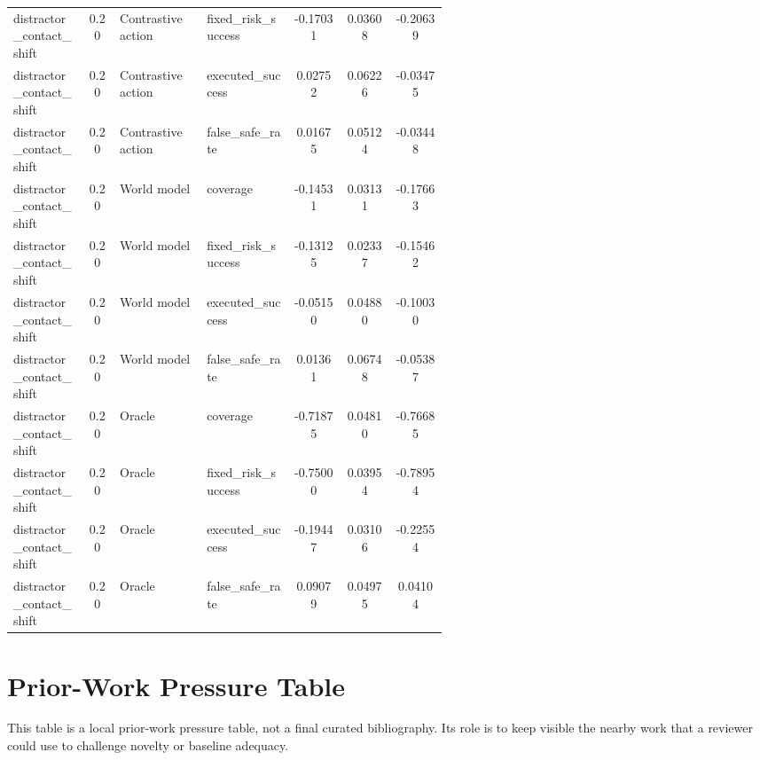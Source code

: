 \documentclass{article}
\begin{document}
\begin{center}
\begin{longtable}{p{0.17\linewidth}cp{0.20\linewidth}p{0.20\linewidth}ccc}
distractor\_contact\_shift & 0.20 & Contrastive action & fixed\_risk\_success & -0.17031 & 0.03608 & -0.20639\\
distractor\_contact\_shift & 0.20 & Contrastive action & executed\_success & 0.02752 & 0.06226 & -0.03475\\
distractor\_contact\_shift & 0.20 & Contrastive action & false\_safe\_rate & 0.01675 & 0.05124 & -0.03448\\
distractor\_contact\_shift & 0.20 & World model & coverage & -0.14531 & 0.03131 & -0.17663\\
distractor\_contact\_shift & 0.20 & World model & fixed\_risk\_success & -0.13125 & 0.02337 & -0.15462\\
distractor\_contact\_shift & 0.20 & World model & executed\_success & -0.05150 & 0.04880 & -0.10030\\
distractor\_contact\_shift & 0.20 & World model & false\_safe\_rate & 0.01361 & 0.06748 & -0.05387\\
distractor\_contact\_shift & 0.20 & Oracle & coverage & -0.71875 & 0.04810 & -0.76685\\
distractor\_contact\_shift & 0.20 & Oracle & fixed\_risk\_success & -0.75000 & 0.03954 & -0.78954\\
distractor\_contact\_shift & 0.20 & Oracle & executed\_success & -0.19447 & 0.03106 & -0.22554\\
distractor\_contact\_shift & 0.20 & Oracle & false\_safe\_rate & 0.09079 & 0.04975 & 0.04104\\
\bottomrule
\end{longtable}
\normalsize
\end{center}

\section{Prior-Work Pressure Table}

This table is a local prior-work pressure table, not a final curated bibliography. Its role is to keep visible the nearby work that a reviewer could use to challenge novelty or baseline adequacy.
\end{document}
